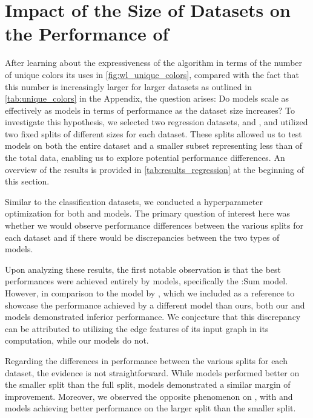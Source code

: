 \section{Impact of the Size of Datasets on the Performance of \wlnn}\label{sec:size_impact}
After learning about the expressiveness of the \wl algorithm in terms of the number of unique colors its uses in \cref{fig:wl_unique_colors}, compared with the fact that this number is increasingly larger for larger datasets as outlined in \cref{tab:unique_colors} in the Appendix, the question arises: Do \wlnn models scale as effectively as \gnn models in terms of performance as the dataset size increases? To investigate this hypothesis, we selected two regression datasets, \alchemy and \zinc, and utilized two fixed splits of different sizes for each dataset. These splits allowed us to test \wlnn models on both the entire dataset and a smaller subset representing less than  of the total data, enabling us to explore potential performance differences. An overview of the results is provided in \cref{tab:results_regression} at the beginning of this section.

Similar to the classification datasets, we conducted a hyperparameter optimization for both \wlnn and \gnn models. The primary question of interest here was whether we would observe performance differences between the various splits for each dataset and if there would be discrepancies between the two types of models.

Upon analyzing these results, the first notable observation is that the best performances were achieved entirely by \gnn models, specifically the \gin:\textsf{Sum} model. However, in comparison to the \textsf{\gineeps} model by \cite{Mor+2020}, which we included as a reference to showcase the performance achieved by a different \gnn model than ours, both our \gnn and \wlnn models demonstrated inferior performance. We conjecture that this discrepancy can be attributed to \textsf{\gineeps} utilizing the edge features of its input graph in its computation, while our models do not.

Regarding the differences in performance between the various splits for each dataset, the evidence is not straightforward. While \wlnn models performed better on the smaller split \alchemyten than the full split, \gnn models demonstrated a similar margin of improvement. Moreover, we observed the opposite phenomenon on \zinc, with \wlnn and \gnn models achieving better performance on the larger \zinc split than the smaller \zincten split.

